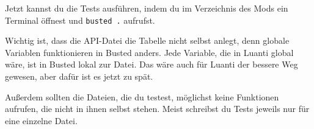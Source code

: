 \begin{Shaded}
\begin{Highlighting}[]
 \OperatorTok{=}   

 \OperatorTok{=} \OperatorTok{\{\}}
\OperatorTok{(}\OperatorTok{)}

\OperatorTok{(}\OperatorTok{,} \OperatorTok{()}
\OperatorTok{(}\OperatorTok{,} \OperatorTok{()}
        \OperatorTok{(}\OperatorTok{,} \OperatorTok{(}\OperatorTok{,} \OperatorTok{))}
    \OperatorTok{)}

\OperatorTok{(}\OperatorTok{,} \OperatorTok{()}
        \OperatorTok{(}\OperatorTok{,} \OperatorTok{({-}}\OperatorTok{,} \OperatorTok{))}
        \OperatorTok{({-}}\OperatorTok{,} \OperatorTok{({-}}\OperatorTok{,} \OperatorTok{{-}}\OperatorTok{))}
    \OperatorTok{)}
\OperatorTok{)}
\end{Highlighting}
\end{Shaded}

Jetzt kannst du die Tests ausführen, indem du im Verzeichnis des Mods
ein Terminal öffnest und \texttt{busted .\allowbreak{}} aufrufst.

Wichtig ist, dass die API-Datei die Tabelle nicht selbst anlegt, denn
globale Variablen funktionieren in Busted anders. Jede Variable, die in
Luanti global wäre, ist in Busted lokal zur Datei. Das wäre auch für
Luanti der bessere Weg gewesen, aber dafür ist es jetzt zu spät.

Außerdem sollten die Dateien, die du testest, möglichst keine Funktionen
aufrufen, die nicht in ihnen selbst stehen. Meist schreibst du Tests
jeweils nur für eine einzelne Datei.


